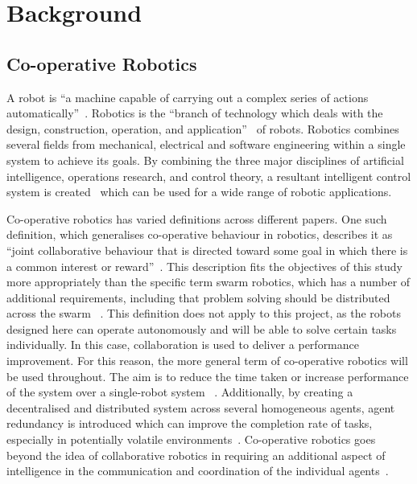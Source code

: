 
\chapter{Background}\label{litreview}

\section{Co-operative Robotics}\label{litreview/robotics}
A robot is ``a machine capable of carrying out a complex series of actions 
automatically''~\cite{robotdef}. 
Robotics is the ``branch of technology which deals with the design, construction, 
operation, and application''~\cite{roboticsdef} of robots. Robotics combines several fields from mechanical, 
electrical and software engineering within a single system to achieve its goals. By 
combining the three major disciplines of artificial intelligence, operations 
research, and control theory, a resultant intelligent control system is created~
\cite{saridis1983intelligent} which can be 
used for a wide range of robotic applications.

Co-operative robotics has varied definitions across different papers. One such
definition, which generalises co-operative behaviour in robotics, describes it 
as ``joint collaborative behaviour that is directed toward some goal in which 
there is a common interest or reward''~\cite{barnes1991behaviour}. This 
description fits the objectives of this study more appropriately than the 
specific term swarm robotics, which has a number of additional requirements, 
including that problem solving should be distributed across the swarm~
\cite{sahin04}. This definition does not apply to this project, as the robots 
designed here can operate autonomously and will be able to solve 
certain tasks individually. In this case, collaboration is used to deliver a 
performance improvement. For this reason, the more general term of co-operative 
robotics will be used throughout. The aim is to reduce the time taken or 
increase performance of the system over a single-robot system~
\cite{premvuti1990consideration}. Additionally, by creating a decentralised and 
distributed system across several homogeneous agents, agent redundancy is 
introduced which can improve the completion rate of tasks, especially in 
potentially volatile environments~\cite{beckers1994local, parker95}.
Co-operative robotics goes beyond the idea of collaborative robotics in 
requiring an additional aspect of intelligence in the communication and 
coordination of the individual agents~\cite{cao1995cooperative}. 

